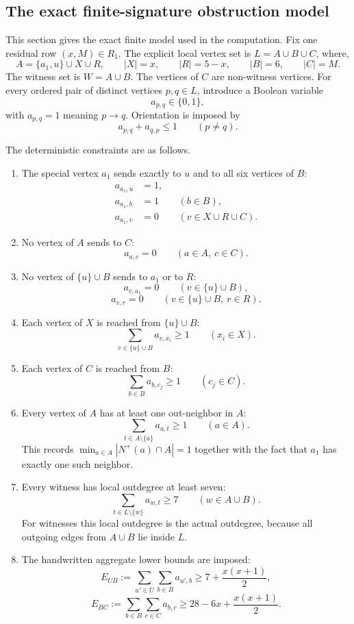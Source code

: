 \documentclass[a4paper,fleqn]{cas-sc}
\theoremstyle{definition}
\begin{document}
\subsection*{The exact finite-signature obstruction model}

This section gives the exact finite model used in the computation. Fix one residual row $(x,M)\in R_1$. The explicit local vertex set is $L=A\cup B\cup C$, where,
\[
A=\{a_1,u\}\cup X\cup R,
\qquad |X|=x,
\qquad |R|=5-x,
\qquad |B|=6,
\qquad |C|=M.
\]
The witness set is $W=A\cup B$. The vertices of $C$ are non-witness vertices. For every ordered pair of distinct vertices $p,q\in L$, introduce a Boolean variable
\[
a_{p,q}\in\{0,1\},
\]
with $a_{p,q}=1$ meaning $p\to q$. Orientation is imposed by
\begin{equation}
a_{p,q}+a_{q,p}\le 1\qquad (p\ne q).\tag{3}
\end{equation}

The deterministic constraints are as follows.
\begin{enumerate}[label=(F\arabic*),leftmargin=*]
\item The special vertex $a_1$ sends exactly to $u$ and to all six vertices of $B$:
\[
\begin{aligned}
a_{a_1,u}&=1,\\
a_{a_1,b}&=1 &&(b\in B),\\
a_{a_1,v}&=0 &&(v\in X\cup R\cup C).
\end{aligned}
\]
\item No vertex of $A$ sends to $C$:
\[
a_{a,c}=0\qquad (a\in A,
\ c\in C).
\]
\item No vertex of $\{u\}\cup B$ sends to $a_1$ or to $R$:
\[
a_{v,a_1}=0\qquad (v\in\{u\}\cup B),
\]
\[
a_{v,r}=0\qquad (v\in\{u\}\cup B,
\ r\in R).
\]
\item Each vertex of $X$ is reached from $\{u\}\cup B$:
\[
\sum_{v\in\{u\}\cup B}a_{v,x_i}\ge 1\qquad (x_i\in X).
\]
\item Each vertex of $C$ is reached from $B$:
\[
\sum_{b\in B}a_{b,c_j}\ge 1\qquad (c_j\in C).
\]
\item Every vertex of $A$ has at least one out-neighbor in $A$:
\[
\sum_{t\in A\setminus\{a\}}a_{a,t}\ge 1\qquad (a\in A).
\]
This records $\min_{a\in A}|N^+(a)\cap A|=1$ together with the fact that $a_1$ has exactly one such neighbor.
\item Every witness has local outdegree at least seven:
\[
\sum_{t\in L\setminus\{w\}}a_{w,t}\ge 7\qquad (w\in A\cup B).
\]
For witnesses this local outdegree is the actual outdegree, because all outgoing edges from $A\cup B$ lie inside $L$.
\item The handwritten aggregate lower bounds are imposed:
\[
E_{UB}:=\sum_{u'\in U}\sum_{b\in B}a_{u',b}
\ge 7+\frac{x(x+1)}2,
\]
\[
E_{BC}:=\sum_{b\in B}\sum_{c\in C}a_{b,c}
\ge 28-6x+\frac{x(x+1)}2.
\]
\end{enumerate}
\end{document}
